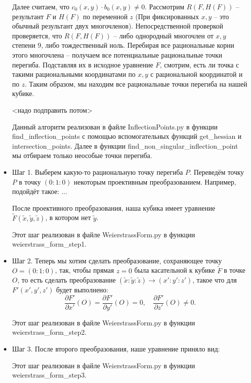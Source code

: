 \begin{itemize}[leftmargin=0.6cm]
    Далее считаем, что \(c_0(x, y) \cdot b_0(x, y) \ne 0\). Рассмотрим
    \(R(F, H(F))\) -- результант \(F\) и \(H(F)\) по переменной \(z\) (При
    фиксированных \(x, y\) -- это обычный результант двух многочленов).
    Непосредственной проверкой проверяется, что \(R(F, H(F))\) --
    либо однородный многочлен от \(x, y\) степени \(9\), либо
    тождественный ноль. Перебирая все рациональные корни этого многочлена
    -- получаем все потенциальные рациональные точки перегиба. Подставляя
    их в исходное уравнение \(F\), смотрим, есть ли точка с такими
    рациональными координатами по \(x, y\) с рациональной координатой и по
    \(z\). Таким образом, мы находим все рациональные точки перегиба на
    нашей кубике. 
    
    <надо подправить потом>

    Данный алгоритм реализован в файле \textsf{InflectionPoints.py} в функции
    \textsf{find\_inflection\_points} с помощью вспомогательных
    функций \textsf{get\_hessian} и \textsf{intersection\_points}. Далее в функции \textsf{find\_non\_singular\_inflection\_point} мы отбираем
    только неособые точки перегиба.
    

    \item Шаг 1. Выберем какую-то рациональную точку перегиба \(P\).
    Переведём точку \(P\) в точку \((0 : 1 : 0)\) некоторым проективным
    преобразованием. Например, подойдёт такое:  ...
    

    После проективного преобразования, наша кубика имеет уравнение
    \(\widetilde{F}(\widetilde{x}, \widetilde{y}, \widetilde{z})\), в
    котором нет \(\widetilde{y}\). 

    Этот шаг реализован в файле \textsf{WeierstrassForm.py} в функции
    \textsf{weierstrass\_form\_step1}.


    \item Шаг 2. Теперь мы хотим сделать преобразование,
    сохраняющее точку \(O = (0 : 1 : 0)\), так, чтобы
    прямая \(z = 0\) была касательной к кубике \(\widetilde{F}\) в точке
    \(O\), то есть сделать преобразование \((\widetilde{x} :
    \widetilde{y} : \widetilde{z}) \to (x' : y' : z')\), такое что
    для \(F'(x', y', z')\) будет выполнено: 
     \[
    \frac{\partial F'}{\partial x'} (O) = \frac{\partial F'}{\partial y'}
    (O) = 0, \quad \frac{\partial F'}{\partial z'} (O) \ne 0
    .\]
    
    Этот шаг реализован в файле \textsf{WeierstrassForm.py} в функции
    \textsf{weierstrass\_form\_step2}.

    \item Шаг 3. После второго преобразования, наше уравнение приняло вид:

    Этот шаг реализован в файле \textsf{WeierstrassForm.py} в функции
    \textsf{weierstrass\_form\_step3}.

\end{itemize}


\bigskip
\bigskip

